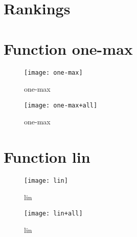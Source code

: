 \graphicspath{{../graphics/}}

\section{Rankings}

\begin{center}

\end{center}

\newpage

\section{Function one-max}

\begin{center}

\end{center}

\begin{figure}[h]
\begin{center}
\texttt{[image: one-max]}
\caption{one-max}
\end{center}
\end{figure}

\begin{figure}[h]
\begin{center}
\texttt{[image: one-max+all]}
\caption{one-max}
\end{center}
\end{figure}

\newpage

\section{Function lin}

\begin{center}

\end{center}

\begin{figure}[h]
\begin{center}
\texttt{[image: lin]}
\caption{lin}
\end{center}
\end{figure}

\begin{figure}[h]
\begin{center}
\texttt{[image: lin+all]}
\caption{lin}
\end{center}
\end{figure}

